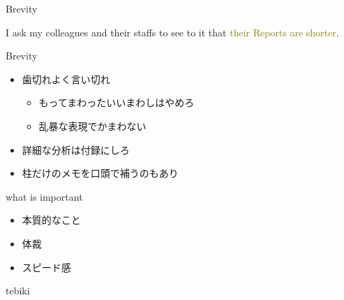 \documentclass[
  ignorenonframetext,
]{beamer}
\providecommand{\tightlist}{%
  \setlength{\itemsep}{0pt}\setlength{\parskip}{0pt}}
\begin{document}
\begin{frame}{Brevity}
\protect\hypertarget{brevity-6}{}
\Large

I ask my colleagues and their staffs to see to it that
\textcolor{olive}{their Reports are shorter}.

\vfill\Huge


\vfill
\end{frame}

\begin{frame}{Brevity}
\protect\hypertarget{brevity-7}{}
\LARGE

\begin{itemize}
 \item[\textbullet] 歯切れよく言い切れ
   \begin{itemize}
    \item もってまわったいいまわしはやめろ
    \item 乱暴な表現でかまわない
   \end{itemize} 
   \pause
  \item[\textbullet] 詳細な分析は付録にしろ
   \pause
  \item[\textbullet] 柱だけのメモを口頭で補うのもあり
\end{itemize}
\end{frame}

\begin{frame}{what is important}
\protect\hypertarget{what-is-important}{}
\Huge

\begin{itemize}[<+->]
\tightlist
\item
  \textbullet{}\hspace{2pt}本質的なこと \bigskip
\item
  \textbullet{}\hspace{2pt}体裁 \bigskip
\item
  \textbullet{}\hspace{2pt}スピード感
\end{itemize}
\end{frame}

\begin{frame}{tebiki}
\protect\hypertarget{tebiki-1}{}
\vspace*{-20pt}
\end{frame}
\end{document}
